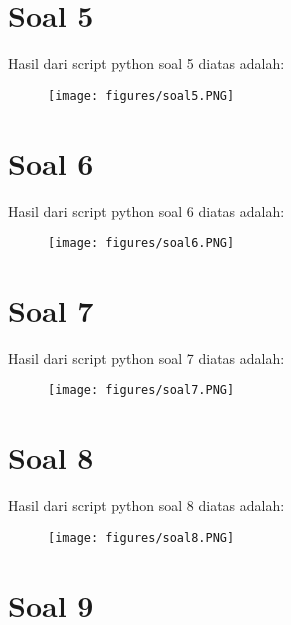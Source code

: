\section{Soal 5}


\par Hasil dari script python soal 5 diatas adalah: 
\begin{figure}[!htbp]
    \centering
    \texttt{[image: figures/soal5.PNG]}
    \label{soal5}
\end{figure}

\section{Soal 6}


\par Hasil dari script python soal 6 diatas adalah: 
\begin{figure}[!htbp]
    \centering
    \texttt{[image: figures/soal6.PNG]}
    \label{soal6}
\end{figure}

\section{Soal 7}


\par Hasil dari script python soal 7 diatas adalah: 
\begin{figure}[!htbp]
    \centering
    \texttt{[image: figures/soal7.PNG]}
    \label{soal7}
\end{figure}

\section{Soal 8}


\par Hasil dari script python soal 8 diatas adalah: 
\begin{figure}[!htbp]
    \centering
    \texttt{[image: figures/soal8.PNG]}
    \label{soal8}
\end{figure}

\section{Soal 9}


